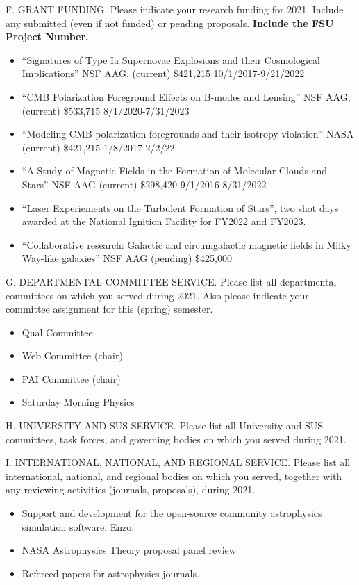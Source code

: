 \noindent F. GRANT FUNDING. Please indicate your research funding
for 2021. Include any submitted  (even if not funded) or pending
proposals.   {\bf Include the FSU Project Number.}
\bigskip
%

\begin{itemize}
    \item ``Signatures of Type Ia Supernovae Explosions and their Cosmological
        Implications'' NSF AAG, (current) \$421,215 10/1/2017-9/21/2022
    \item ``CMB Polarization Foreground Effects on B-modes and Lensing'' NSF
        AAG, (current) \$533,715 8/1/2020-7/31/2023
    \item ``Modeling CMB polarization foregrounds and their isotropy violation''
        NASA (current) \$421,215 1/8/2017-2/2/22
    \item ``A Study of Magnetic Fields in the Formation of Molecular Clouds and
        Stars'' NSF AAG (current) \$298,420 9/1/2016-8/31/2022
    \item ``Laser Experiements on the Turbulent Formation of Stars'', two shot
        days awarded at the National Ignition Facility for FY2022 and FY2023.
    \item ``Collaborative research: Galactic and circumgalactic magnetic fields
        in Milky Way-like galaxies'' NSF AAG (pending) \$425,000
\end{itemize}

\noindent G. DEPARTMENTAL COMMITTEE SERVICE. Please list all
departmental committees on which you served during 2021.  Also
please indicate your committee assignment for this (spring)
semester.
\bigskip
%
\begin{itemize}
    \item Qual Committee
    \item Web Committee (chair)
    \item PAI Committee (chair)
    \item Saturday Morning Physics
\end{itemize}

\noindent H. UNIVERSITY AND SUS SERVICE. Please list all University
and SUS committees, task forces, and governing bodies on which you
served during 2021.
\bigskip
%

\noindent I. INTERNATIONAL, NATIONAL, AND REGIONAL  SERVICE. Please
list all international, national, and regional bodies on which you
served, together with any reviewing activities (journals,
proposals), during 2021.
\bigskip

\begin{itemize}
    \item Support and development for the open-source community astrophysics
        simulation software, Enzo.
    \item NASA Astrophysics Theory proposal panel review
    \item Refereed papers for astrophysics journals.
\end{itemize}

